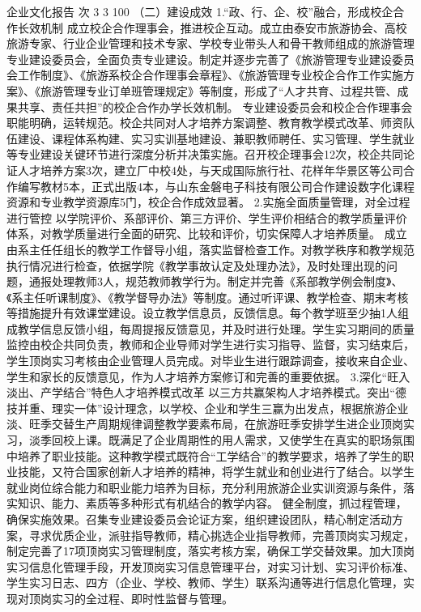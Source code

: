 企业文化报告 
次
3
3
100%
（二）建设成效
1.“政、行、企、校”融合，形成校企合作长效机制
成立校企合作理事会，推进校企互动。成立由泰安市旅游协会、高校旅游专家、行业企业管理和技术专家、学校专业带头人和骨干教师组成的旅游管理专业建设委员会，全面负责专业建设。制定并逐步完善了《旅游管理专业建设委员会工作制度》、《旅游系校企合作理事会章程》、《旅游管理专业校企合作工作实施方案》、《旅游管理专业订单班管理规定》等制度，形成了“人才共育、过程共管、成果共享、责任共担”的校企合作办学长效机制。
专业建设委员会和校企合作理事会职能明确，运转规范。校企共同对人才培养方案调整、教育教学模式改革、师资队伍建设、课程体系构建、实习实训基地建设、兼职教师聘任、实习管理、学生就业等专业建设关键环节进行深度分析并决策实施。召开校企理事会12次，校企共同论证人才培养方案3次，建立厂中校4处，与天成国际旅行社、花样年华景区等公司合作编写教材5本，正式出版4本，与山东金磐电子科技有限公司合作建设数字化课程资源和专业教学资源库5门，校企合作成效显著。
2.实施全面质量管理，对全过程进行管控
以学院评价、系部评价、第三方评价、学生评价相结合的教学质量评价体系，对教学质量进行全面的研究、比较和评价，切实保障人才培养质量。
成立由系主任任组长的教学工作督导小组，落实监督检查工作。对教学秩序和教学规范执行情况进行检查，依据学院《教学事故认定及处理办法》，及时处理出现的问题，通报处理教师3人，规范教师教学行为。制定并完善《系部教学例会制度》、《系主任听课制度》、《教学督导办法》等制度。通过听评课、教学检查、期末考核等措施提升有效课堂建设。设立教学信息员，反馈信息。每个教学班至少抽1人组成教学信息反馈小组，每周提报反馈意见，并及时进行处理。学生实习期间的质量监控由校企共同负责，教师和企业导师对学生进行实习指导、监督，实习结束后，学生顶岗实习考核由企业管理人员完成。对毕业生进行跟踪调查，接收来自企业、学生和家长的反馈意见，作为人才培养方案修订和完善的重要依据。
3.深化“旺入淡出、产学结合”特色人才培养模式改革
以三方共赢架构人才培养模式。突出“德技并重、理实一体”设计理念，以学校、企业和学生三赢为出发点，根据旅游企业淡、旺季交替生产周期规律调整教学要素布局，在旅游旺季安排学生进企业顶岗实习，淡季回校上课。既满足了企业周期性的用人需求，又使学生在真实的职场氛围中培养了职业技能。这种教学模式既符合“工学结合”的教学要求，培养了学生的职业技能，又符合国家创新人才培养的精神，将学生就业和创业进行了结合。以学生就业岗位综合能力和职业能力培养为目标，充分利用旅游企业实训资源与条件，落实知识、能力、素质等多种形式有机结合的教学内容。
健全制度，抓过程管理，确保实施效果。召集专业建设委员会论证方案，组织建设团队，精心制定活动方案，寻求优质企业，派驻指导教师，精心挑选企业指导教师，完善顶岗实习规定，制定完善了17项顶岗实习管理制度，落实考核方案，确保工学交替效果。加大顶岗实习信息化管理手段，开发顶岗实习信息管理平台，对实习计划、实习评价标准、学生实习日志、四方（企业、学校、教师、学生）联系沟通等进行信息化管理，实现对顶岗实习的全过程、即时性监督与管理。
